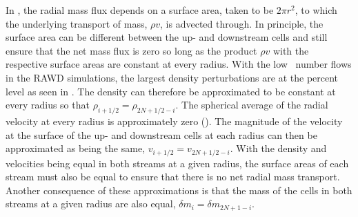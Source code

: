 \documentclass[fleqn,usenatbib]{mnras}
\begin{document}
In , the radial mass flux depends on a surface area, taken
to be $2 \pi r^{2}$, to which the underlying transport of mass, $\rho
v$, is advected through. In principle, the surface area can be
different between the up- and downstream cells and still ensure that
the net mass flux is zero so long as the product $\rho v$ with the
respective surface areas are constant at every radius.  With the low
\mach~number flows in the RAWD simulations, the largest density
perturbations are at the percent level as seen in . The
density can therefore be approximated to be constant at every radius
so that $\rho_{i+1/2} = \rho_{2N+1/2-i}$. The spherical average of the
radial velocity at every radius is approximately zero
(). The magnitude of the velocity at the surface of the
up- and downstream cells at each radius can then be approximated as
being the same, $v_{i+1/2} = v_{2N+1/2-i}$. With the density and
velocities being equal in both streams at a given radius, the surface
areas of each stream must also be equal to ensure that there is no net
radial mass transport. Another consequence of these approximations is
that the mass of the cells in both streams at a given radius are also
equal, $\delta m_{i} = \delta m_{2N+1-i}$.
\end{document}
